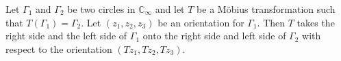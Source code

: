 Let $\Gamma_1$ and $\Gamma_2$ be two circles in $\mathbb{C}_{\infty}$ and let $T$ be a Möbius transformation such that $T(\Gamma_1) = \Gamma_2$. Let $(z_1, z_2, z_3)$ be an orientation for $\Gamma_1$. Then $T$ takes the right side and the left side of $\Gamma_1$ onto the right side and left side of $\Gamma_2$ with respect to the orientation $(Tz_1, Tz_2, Tz_3)$.